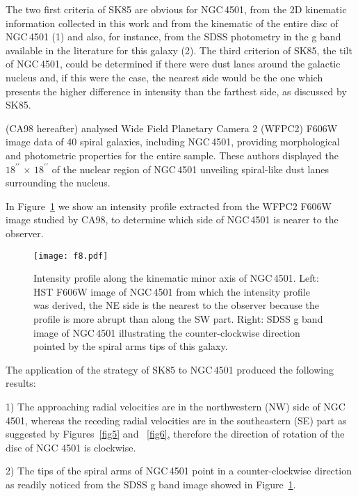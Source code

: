 \documentclass[fleqn,usenatbib]{mnras}
\begin{document}
The two first criteria of SK85 are obvious for NGC\,4501, from the 2D kinematic information collected in this work and from the kinematic of the entire disc of NGC\,4501 
\citep{Chemin2006} (1) and also, for instance, from the SDSS photometry in the g band available in the literature for this galaxy \citep{Adelman2006} (2).
The third criterion of SK85, the tilt of NGC\,4501, could be determined if there were dust lanes around the galactic nucleus and, if this were the case, the nearest side would
be the one which presents the higher difference in intensity than the farthest side, as discussed by SK85. 

\citet{Carollo1998} (CA98 hereafter) analysed Wide Field Planetary Camera 2 (WFPC2) F606W image data of 40 spiral galaxies, including NGC\,4501, providing morphological and 
photometric properties for the entire sample. These authors displayed the $18^{\prime\prime}\,\times\,18^{\prime\prime}$ of the nuclear region of NGC\,4501 
unveiling spiral-like dust lanes surrounding the nucleus.

In Figure~\ref{fig8} we show an intensity profile extracted from the WFPC2 F606W image studied by CA98, to determine which side of NGC\,4501 is nearer to the observer. 

\begin{figure}
\hspace*{-0.6cm}
\texttt{[image: f8.pdf]}
\caption{Intensity profile along the kinematic minor axis of NGC\,4501. 
Left: HST F606W image of NGC\,4501 from which the intensity profile was derived, 
the NE side is the nearest to the observer because the profile is more abrupt than 
along the SW part. Right: SDSS g band image of NGC\,4501 illustrating the 
counter-clockwise direction pointed by the spiral arms tips of this galaxy.}
\label{fig8} 
\end{figure}

The application of the strategy of SK85 to NGC\,4501 produced the following results:

1) The approaching radial velocities are in the northwestern (NW) side of NGC\,4501, whereas the receding radial velocities are in the southeastern (SE) part as suggested by 
Figures~\ref{fig5} and ~\ref{fig6}, therefore the direction of rotation of the disc of NGC 4501 is clockwise. 

2) The tips of the spiral arms of NGC\,4501 point in a counter-clockwise direction as readily noticed from the SDSS g band image showed in Figure~\ref{fig8}.
\end{document}
